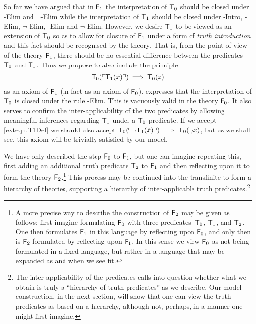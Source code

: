 \documentclass[UKenglish,cleveref,DIV=12]{scrartcl}
\theoremstyle{definition}
\theoremstyle{definition}
\begin{document}
So far we have argued that in $\mathsf{F}_1$ the interpretation of $\mathsf{T}_0$ should be
closed under -Elim and $\lnot$-Elim while the interpretation of
$\mathsf{T}_1$ should be closed under -Intro, -Elim, $\lnot$-Elim,
-Elim and $\lnot$-Elim. However, we desire $\mathsf{T}_1$ to be
viewed as an extension of $\mathsf{T}_0$ so as to allow for closure of $\mathsf{F}_1$ under a
form of {\em truth introduction} and this fact should be recognised by the
theory. That is, from the point of view of the theory $\mathsf{F}_1$, there should be no
essential difference between the predicates $\mathsf{T}_0$ and $\mathsf{T}_1$. Thus we propose to
also include the principle
\begin{gather}\label{exteqn:T1Del}
  \mathsf{T}_0(\ulcorner{\mathsf{T}_1(\dot x)}\urcorner)\implies \mathsf{T}_0(x)
\end{gather}
as an axiom of $\mathsf{F}_1$ (in fact as an axiom of $\mathsf{F}_0$).
 expresses that the interpretation of $\mathsf{T}_0$ is closed under
the rule -Elim. This is vacuously valid in the theory $\mathsf{F}_0$. It also
serves to confirm the inter-applicability of the two predicates by allowing
meaningful inferences regarding $\mathsf{T}_1$ under a $\mathsf{T}_0$ predicate. If we accept
\cref{exteqn:T1Del} we should also accept $\T_0(\gn{\lnot \T_1(\dot x)})\implies
\T_0(\dlnot x)$, but as we shall see, this axiom will be trivially satisfied by
our model.


We have only described the step $\mathsf{F}_0$ to $\mathsf{F}_1$, but one can imagine repeating
this, first adding an additional truth predicate $\mathsf{T}_2$ to $\mathsf{F}_1$ and then
reflecting upon it to form the theory $\mathsf{F}_2$.\footnote{A more precise
way to describe the construction of $\mathsf{F}_2$ may be given as follows: first imagine formulating $\mathsf{F}_0$
with three predicates, $\mathsf{T}_0$, $\mathsf{T}_1$, and $\mathsf{T}_2$. One then formulates $\mathsf{F}_1$ in this
language by reflecting upon $\mathsf{F}_0$, and only then is $\mathsf{F}_2$ formulated by reflecting
upon $\mathsf{F}_1$. In this sense we view $\mathsf{F}_0$ as not being formulated in a fixed
language, but rather in a language that may be expanded as and when we see fit.} This process may be
continued into the transfinite to form a hierarchy of theories, supporting a
hierarchy of inter-applicable truth predicates.\footnote{The inter-applicability
of the predicates calls into question whether what we obtain is truly a
``hierarchy of truth predicates'' as we describe. Our model construction, in the
next section, will show that one {can} view the truth predicates as based on
a hierarchy, although not, perhaps, in a manner one might first imagine.}
\end{document}
